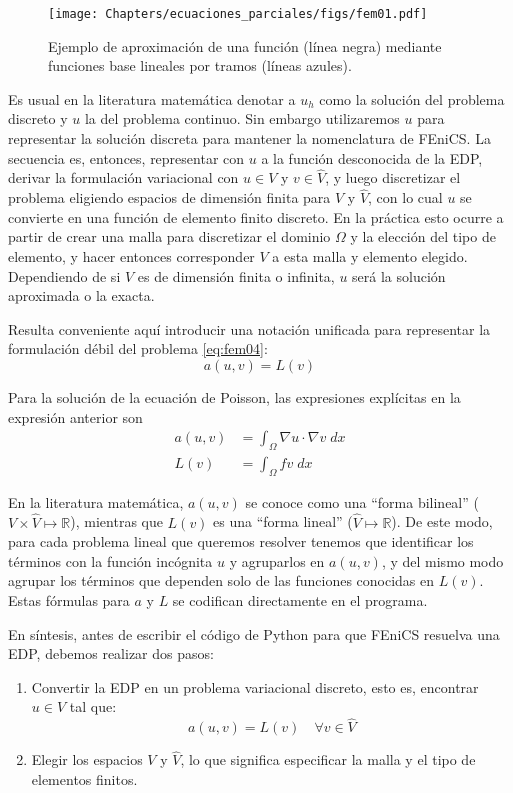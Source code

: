 \begin{figure}[ht]
 \centering
 \texttt{[image: Chapters/ecuaciones\_parciales/figs/fem01.pdf]}
 \caption{Ejemplo de aproximación de una función (línea negra) mediante funciones base lineales por tramos (líneas azules).}
 \label{fig:fem01}
\end{figure}

Es usual en la literatura matemática denotar a $u_h$ como la solución del problema discreto y $u$ la del problema continuo. Sin embargo utilizaremos $u$ para representar la solución discreta para mantener la nomenclatura de FEniCS. La secuencia es, entonces, representar con $u$ a la función desconocida de la EDP, derivar la formulación variacional con $u \in V$ y $v \in \hat{V}$, y luego discretizar el problema eligiendo espacios de dimensión finita para $V$ y $\hat{V}$, con lo cual $u$ se convierte en una función de elemento finito discreto. En la práctica esto ocurre a partir de crear una malla para discretizar el dominio $\Omega$ y la elección del tipo de elemento, y hacer entonces corresponder $V$ a esta malla y elemento elegido. Dependiendo de si $V$ es de dimensión finita o infinita, $u$ será la solución aproximada o la exacta.

Resulta conveniente aquí introducir una notación unificada para representar la formulación débil del problema \eqref{eq:fem04}:
\begin{equation}\label{eq:fem-debil}
a(u, v) = L(v)
\end{equation}

Para la solución de la ecuación de Poisson, las expresiones explícitas en la expresión anterior son
\begin{align}
 a(u, v) &= \int_{\Omega} \nabla u \cdot \nabla v \; dx \label{eq:fembilineal} \\
 L(v) &= \int_{\Omega} f v \; dx \label{eq:femlineal} 
\end{align}

En la literatura matemática, $a(u, v)$ se conoce como una ``forma bilineal'' ($V \times \hat{V} \mapsto \mathbb{R}$), mientras que $L(v)$ es una ``forma lineal'' ($\hat{V} \mapsto \mathbb{R}$). De este modo, para cada problema lineal que queremos resolver tenemos que identificar los términos con la función incógnita $u$ y agruparlos en $a(u, v)$, y del mismo modo agrupar los términos que dependen solo de las funciones conocidas en $L(v)$. Estas fórmulas para $a$ y $L$ se codifican directamente en el programa.

En síntesis, antes de escribir el código de Python para que FEniCS resuelva una EDP, debemos realizar dos pasos:
\begin{enumerate}
 \item Convertir la EDP en un problema variacional discreto, esto es, encontrar $u \in V$ tal que:
 \begin{equation}
  a(u, v) = L(v) \quad \forall v \in \hat{V}
 \end{equation} 
 \item Elegir los espacios $V$ y $\hat{V}$, lo que significa especificar la malla y el tipo de elementos finitos.
\end{enumerate}

